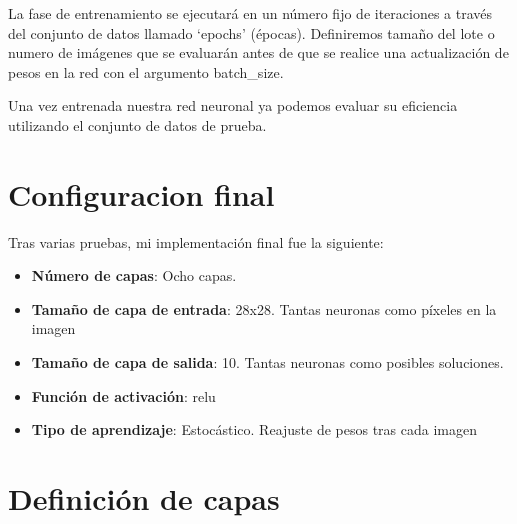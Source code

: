 \bigskip
La fase de entrenamiento se ejecutará en un número fijo de iteraciones a través del conjunto de datos llamado `epochs' (épocas). Definiremos tamaño del lote o numero de imágenes que se evaluarán antes de que se realice una actualización de pesos en la red con el argumento batch\_size. 

\bigskip
Una vez entrenada nuestra red neuronal ya podemos evaluar su eficiencia utilizando el conjunto de datos de prueba.

\section{Configuracion final}

Tras varias pruebas, mi implementación final fue la siguiente:
\begin{itemize}
	\item \textbf{Número de capas}: Ocho capas.
	\item \textbf{Tamaño de capa de entrada}: 28x28. Tantas neuronas como píxeles en la imagen
	\item \textbf{Tamaño de capa de salida}: 10. Tantas neuronas como posibles soluciones. 
	\item \textbf{Función de activación}: relu
	\item \textbf{Tipo de aprendizaje}: Estocástico. Reajuste de pesos tras cada imagen
\end{itemize}


\section{Definición de capas} 

